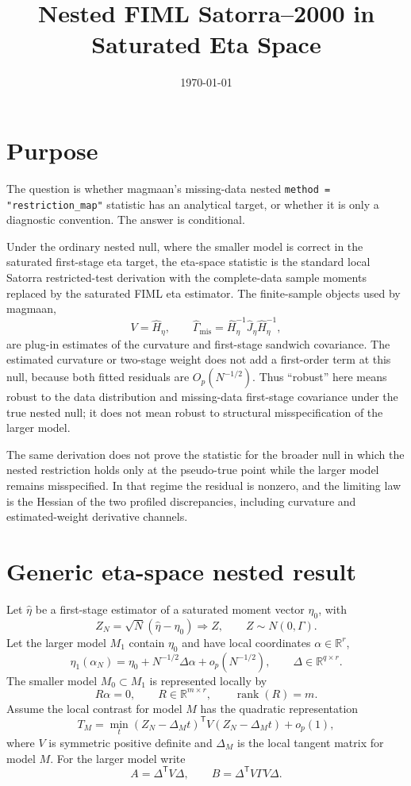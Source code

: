 \documentclass[11pt]{article}
\title{Nested FIML Satorra--2000 in Saturated Eta Space}
\author{}
\date{\today}
\newcommand{\rank}{\operatorname{rank}}
\newcommand{\T}{^{\mathsf T}}
\newcommand{\op}{o_p}
\newcommand{\Op}{O_p}
\theoremstyle{plain}
\theoremstyle{remark}
\begin{document}
\maketitle

\section*{Purpose}

The question is whether magmaan's missing-data nested
\texttt{method = "restriction\_map"} statistic has an analytical target, or
whether it is only a diagnostic convention. The answer is conditional.

Under the ordinary nested null, where the smaller model is correct in the
saturated first-stage eta target, the eta-space statistic is the standard local
Satorra restricted-test derivation with the complete-data sample moments
replaced by the saturated FIML eta estimator. The finite-sample objects used by
magmaan,
\[
  V=\widehat H_\eta,\qquad
  \widehat\Gamma_{\mathrm{mis}}
  =\widehat H_\eta^{-1}\widehat J_\eta\widehat H_\eta^{-1},
\]
are plug-in estimates of the curvature and first-stage sandwich covariance.
The estimated curvature or two-stage weight does not add a first-order term at
this null, because both fitted residuals are \(\Op(N^{-1/2})\).
Thus ``robust'' here means robust to the data distribution and missing-data
first-stage covariance under the true nested null; it does not mean robust to
structural misspecification of the larger model.

The same derivation does not prove the statistic for the broader null in which
the nested restriction holds only at the pseudo-true point while the larger
model remains misspecified. In that regime the residual is nonzero, and the
limiting law is the Hessian of the two profiled discrepancies, including
curvature and estimated-weight derivative channels.

\section{Generic eta-space nested result}
\label{sec:generic}

Let \(\hat\eta\) be a first-stage estimator of a saturated moment vector
\(\eta_0\), with
\[
  Z_N=\sqrt N(\hat\eta-\eta_0)
  \Rightarrow Z,\qquad Z\sim N(0,\Gamma).
\]
Let the larger model \(M_1\) contain \(\eta_0\) and have local coordinates
\(\alpha\in\mathbb R^r\),
\[
  \eta_1(\alpha_N)
  =\eta_0+N^{-1/2}\Delta\alpha+\op(N^{-1/2}),
  \qquad \Delta\in\mathbb R^{q\times r}.
\]
The smaller model \(M_0\subset M_1\) is represented locally by
\[
  R\alpha=0,\qquad R\in\mathbb R^{m\times r},\qquad \rank(R)=m.
\]
Assume the local contrast for model \(M\) has the quadratic representation
\[
  T_M
  =
  \min_t (Z_N-\Delta_M t)\T V(Z_N-\Delta_M t)+\op(1),
  \label{eq:local-contrast}
\]
where \(V\) is symmetric positive definite and \(\Delta_M\) is the local tangent
matrix for model \(M\). For the larger model write
\[
  A=\Delta\T V\Delta,\qquad
  B=\Delta\T V\Gamma V\Delta.
\]
\end{document}

